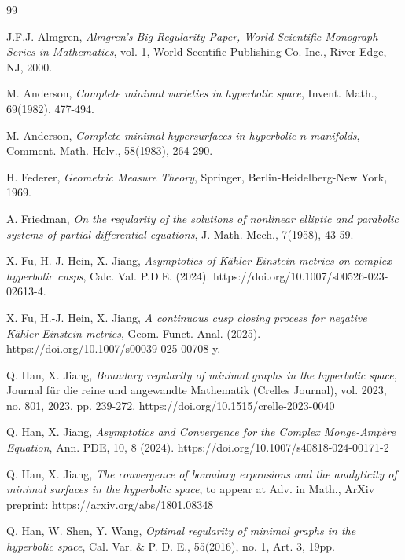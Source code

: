 \documentclass[11pt,reqno]{amsart}
\theoremstyle{definition}
\numberwithin{equation}{section}
\begin{document}
\begin{thebibliography}{99}

 J.F.J. Almgren, {\it Almgren’s Big Regularity Paper, World Scientific Monograph Series in Mathematics}, vol. 1, World Scentific Publishing Co. Inc., River Edge, NJ, 2000.


M. Anderson, {\it Complete minimal varieties in hyperbolic space},
Invent. Math., 69(1982), 477-494.

M. Anderson, {\it Complete minimal hypersurfaces in hyperbolic {$n$}-manifolds},
Comment. Math. Helv., 58(1983), 264-290.


H. Federer, {\it Geometric Measure Theory}, Springer, Berlin-Heidelberg-New York, 1969.

 A. Friedman, \emph{On the regularity of the solutions of nonlinear elliptic and 
parabolic systems of partial differential equations}, J. Math. Mech., 7(1958), 43-59.

X. Fu, H.-J. Hein, X. Jiang, {\it
Asymptotics of K\"ahler-Einstein metrics on complex hyperbolic cusps}, Calc. Val. P.D.E. (2024). https://doi.org/10.1007/s00526-023-02613-4.

X. Fu, H.-J. Hein, X. Jiang, {\it
A continuous cusp closing process for negative K\"ahler-Einstein metrics}, 
Geom. Funct. Anal. (2025). https://doi.org/10.1007/s00039-025-00708-y.

 Q. Han, X. Jiang, {\it Boundary regularity of minimal graphs in the hyperbolic space}, Journal für die reine und angewandte Mathematik (Crelles Journal), vol. 2023, no. 801, 2023, pp. 239-272. https://doi.org/10.1515/crelle-2023-0040

 Q. Han, X. Jiang, {\it Asymptotics and Convergence for the Complex Monge-Ampère Equation}, Ann. PDE, 10, 8 (2024). https://doi.org/10.1007/s40818-024-00171-2

 Q. Han, X. Jiang, {\it The convergence of boundary expansions and the analyticity of minimal surfaces in the hyperbolic space}, to appear at Adv. in Math., ArXiv preprint: https://arxiv.org/abs/1801.08348

 Q. Han, W. Shen, Y. Wang, {\it Optimal regularity of minimal graphs in the hyperbolic 
space}, Cal. Var. \& P. D. E., 55(2016), no. 1, Art. 3, 19pp. 


\end{thebibliography}
\end{document}
